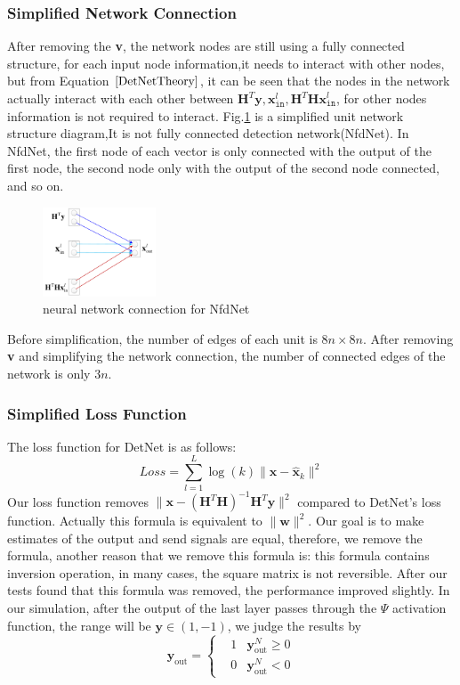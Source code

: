 \documentclass[conference]{IEEEtran}
\begin{document}
\subsubsection{Simplified Network Connection} After removing the \textbf{v}, the network nodes are still using a fully connected structure, for each input node information,it needs to interact with other nodes, but from Equation \(\ref{DetNetTheory}\), it can be seen that the nodes in the network actually interact with each other between ${\textbf{H}^T\textbf{y}, \textbf{x}_{\texttt{in}}^l, \textbf{H}^T\textbf{Hx}_{\texttt{in}}^l}$, for other nodes information is not required to interact. Fig.\ref{NfdNet} is a simplified unit network structure diagram,It is not fully connected detection network(NfdNet). In NfdNet, the first node of each vector is only connected with the output of the first node, the second node only with the output of the second node connected, and so on.
\begin{figure}[ht]
  \centering
  \includegraphics[width=0.3\textwidth]{NfdNet.pdf}
  \caption{neural network connection for NfdNet}
  \label{NfdNet}
\end{figure}
Before simplification, the number of edges of each unit is ${8n \times 8n}$. After removing \textbf{v} and simplifying the network connection, the number of connected edges of the network is only ${3n}$.
\subsubsection{Simplified Loss Function} The loss function for DetNet is as follows:
\begin{equation}
\label{NfdNetLoss}
Loss=\sum_{l=1}^L\log\left(k\right)\|\textbf{x}-\hat{\textbf{x}}_k\|^2
\end{equation}
Our loss function removes ${\|\textbf{x}-\left(\textbf{H}^T\textbf{H}\right)^{-1}\textbf{H}^T\textbf{y}\|^2}$ compared to DetNet's loss function. Actually this formula is equivalent to  ${\|\textbf{w}\|^2}$. Our goal is to make estimates of the output and send signals are equal, therefore, we remove the formula, another reason that we remove this formula is: this formula contains inversion operation, in many cases, the square matrix is not reversible. After our tests found that this formula was removed, the performance improved slightly.
In our simulation, after the output of the last layer passes through the $\Psi$ activation function, the range will be ${\textbf{y}\in\left(1,-1\right)}$, we judge the results by
\begin{equation}
\textbf{y}_{\textrm{out}}=\left\{
\begin{aligned}
&1  &\mbox{${\textbf{y}_{\textrm{out}}^N\geqslant0}$}\\
&0  &\mbox{${\textbf{y}_{\textrm{out}}^N<0}$}
\end{aligned}
\right.
\end{equation}
\end{document}
